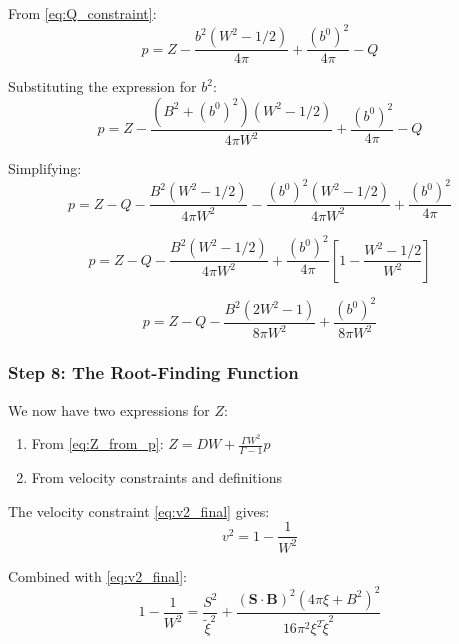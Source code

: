 \documentclass[12pt,a4paper]{article}
\begin{document}
From \eqref{eq:Q_constraint}:
\begin{equation}
p = Z - \frac{b^2(W^2 - 1/2)}{4\pi} + \frac{(b^0)^2}{4\pi} - Q
\label{eq:p_from_Z}
\end{equation}

Substituting the expression for $b^2$:
\begin{equation}
p = Z - \frac{(B^2 + (b^0)^2)(W^2 - 1/2)}{4\pi W^2} + \frac{(b^0)^2}{4\pi} - Q
\label{eq:p_from_Z_expanded}
\end{equation}

Simplifying:
\begin{equation}
p = Z - Q - \frac{B^2(W^2 - 1/2)}{4\pi W^2} - \frac{(b^0)^2(W^2 - 1/2)}{4\pi W^2} + \frac{(b^0)^2}{4\pi}
\end{equation}

\begin{equation}
p = Z - Q - \frac{B^2(W^2 - 1/2)}{4\pi W^2} + \frac{(b^0)^2}{4\pi}\left[1 - \frac{W^2 - 1/2}{W^2}\right]
\end{equation}

\begin{equation}
p = Z - Q - \frac{B^2(2W^2 - 1)}{8\pi W^2} + \frac{(b^0)^2}{8\pi W^2}
\label{eq:p_simplified}
\end{equation}

\subsubsection{Step 8: The Root-Finding Function}

We now have two expressions for $Z$:
\begin{enumerate}
    \item From \eqref{eq:Z_from_p}: $Z = DW + \frac{\Gamma W^2}{\Gamma-1}p$
    \item From velocity constraints and definitions
\end{enumerate}

The velocity constraint \eqref{eq:v2_final} gives:
\begin{equation}
v^2 = 1 - \frac{1}{W^2}
\label{eq:v2_from_W}
\end{equation}

Combined with \eqref{eq:v2_final}:
\begin{equation}
1 - \frac{1}{W^2} = \frac{S^2}{\tilde{\xi}^2} + \frac{(\bm{S} \cdot \bm{B})^2(4\pi\xi + B^2)^2}{16\pi^2 \xi^2 \tilde{\xi}^2}
\label{eq:velocity_constraint}
\end{equation}
\end{document}
